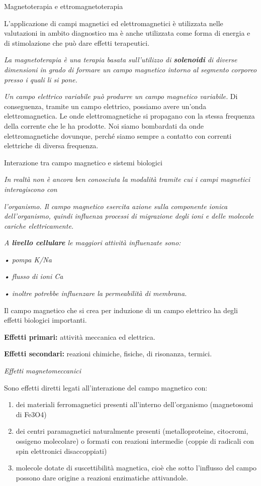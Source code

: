 \documentclass[]{article}
\date{}
\begin{document}
Magnetoterapia e ettromagnetoterapia

L'applicazione di campi magnetici ed elettromagnetici è utilizzata nelle
valutazioni in ambito diagnostico ma è anche utilizzata come forma di
energia e di stimolazione che può dare effetti terapeutici.

\emph{La magnetoterapia è una terapia basata sull'utilizzo di
\textbf{solenoidi} di diverse dimensioni in grado di formare un campo
magnetico intorno al segmento corporeo presso i quali li si pone.}

\emph{Un campo elettrico variabile può produrre un campo magnetico
variabile.} Di conseguenza, tramite un campo elettrico, possiamo avere
un'onda elettromagnetica. Le onde elettromagnetiche si propagano con la
stessa frequenza della corrente che le ha prodotte. Noi siamo bombardati
da onde elettromagnetiche dovunque, perché siamo sempre a contatto con
correnti elettriche di diversa frequenza.

Interazione tra campo magnetico e sistemi biologici

\emph{In realtà non è ancora ben conosciuta la modalità tramite cui i
campi magnetici interagiscono con}

\emph{l'organismo. Il campo magnetico esercita azione sulla componente
ionica dell'organismo, quindi influenza processi di migrazione degli
ioni e delle molecole cariche elettricamente.}

\emph{A \textbf{livello cellulare} le maggiori attività influenzate
sono:}

\emph{• pompa K/Na}

\emph{• flusso di ioni Ca}

\emph{• inoltre potrebbe influenzare la permeabilità di membrana.}

Il campo magnetico che si crea per induzione di un campo elettrico ha
degli effetti biologici importanti.

\textbf{Effetti primari:} attività meccanica ed elettrica.

\textbf{Effetti secondari:} reazioni chimiche, fisiche, di risonanza,
termici.

\emph{Effetti magnetomeccanici }

Sono effetti diretti legati all'interazione del campo magnetico con:

\begin{enumerate}
\def\labelenumi{\arabic{enumi}.}
\item
  dei materiali ferromagnetici presenti all'interno dell'organismo
  (magnetosomi di Fe3O4)
\item
  dei centri paramagnetici naturalmente presenti (metalloproteine,
  citocromi, ossigeno molecolare) o formati con reazioni intermedie
  (coppie di radicali con spin elettronici disaccoppiati)
\item
  molecole dotate di suscettibilità magnetica, cioè che sotto l'influsso
  del campo possono dare origine a reazioni enzimatiche attivandole.
\end{enumerate}
\end{document}
